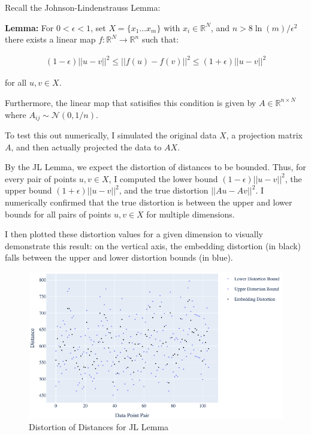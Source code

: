\documentclass{article}
\begin{document}
    Recall the Johnson-Lindenstrauss Lemma:

    \textbf{Lemma:} For $0<\epsilon<1$, set $X= \{ x_1 \ldots x_m \}$ with $x_i \in \mathbb{R}^N$, and $ n > 8 \ln(m)/ \epsilon^2$ there exists a linear map $f: \mathbb{R}^N \rightarrow \mathbb{R}^n$ such that:

    \begin{align*}
        (1 - \epsilon) ||u - v||^2 \leq ||f(u) - f(v)||^2 \leq (1 + \epsilon) ||u - v||^2
    \end{align*}

    for all $u,v \in X$.

    Furthermore, the linear map that satisifies this condition is given by $A \in \mathbb{R}^{n \times N}$ where $A_{ij} \sim \mathcal{N}(0, 1/n)$.

    To test this out numerically, I simulated the original data $X$, a projection matrix $A$, and then actually projected the data to $AX$.
    
    By the JL Lemma, we expect the distortion of distances to be bounded. Thus, for every pair of points $u, v \in X$, I computed the lower bound $(1-\epsilon) ||u - v||^2$, the upper bound $(1 + \epsilon) ||u-v||^2$, and the true distortion $||Au - Av||^2$. I numerically confirmed that the true distortion is between the upper and lower bounds for all pairs of points $u,v \in X$ for multiple dimensions.
    
    I then plotted these distortion values for a given dimension to visually demonstrate this result: on the vertical axis, the embedding distortion (in black) falls between the upper and lower distortion bounds (in blue).

    \begin{figure}[h]
        \label{fig:jl_distortion} 
        \includegraphics[width=1.3\linewidth]{images/q6/distortion.png}
        \caption{Distortion of Distances for JL Lemma}
    \end{figure}
\end{document}
